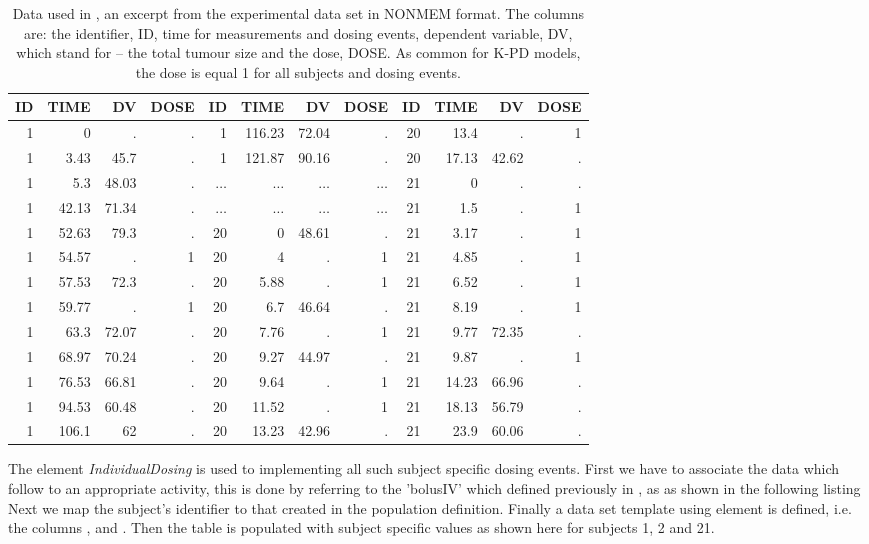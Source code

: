 \begin{table}[htdp]
\begin{center}
\begin{tabular}{rrrr | rrrr | rrrr}\toprule
ID&TIME&DV&DOSE & ID&TIME&DV&DOSE& 			ID&TIME&DV&DOSE \\\midrule
1&0&.&.& 		 	1&116.23&72.04&.& 				20&13.4&.&1\\
1&3.43&45.7&.& 	1&121.87&90.16&.& 				20&17.13&42.62&.\\
1&5.3&48.03&.& 	$\dots$ &$\dots$ &$\dots$ & $\dots$&	21&0&.&.\\
1&42.13&71.34&.& 	$\dots$ &$\dots$ &$\dots$ & $\dots$&	21&1.5&.&1\\
1&52.63&79.3&.& 	20&0&48.61&.&					21&3.17&.&1\\
1&54.57&.&1 & 	20&4&.&1&						21&4.85&.&1\\
1&57.53&72.3&.& 	20&5.88&.&1&						21&6.52&.&1\\
1&59.77&.&1 & 	20&6.7&46.64&.&					21&8.19&.&1\\
1&63.3&72.07&.& 	20&7.76&.&1&						21&9.77&72.35&.\\
1&68.97&70.24&.& 	20&9.27&44.97&.&					21&9.87&.&1\\
1&76.53&66.81&.& 	20&9.64&.&1&						21&14.23&66.96&.\\
1&94.53&60.48&.&	20&11.52&.&1&					21&18.13&56.79&.\\
1&106.1&62&.& 	20&13.23&42.96&.&					21&23.9&60.06&.\\\bottomrule
\end{tabular}
\end{center}
\caption{Data used in \cite{Ribba:2012uq}, an excerpt from the experimental data set in NONMEM format. 
The columns are: the identifier, ID, time for measurements and dosing events, 
dependent variable, DV, which stand for  -- the total tumour size and 
the dose, DOSE. As common for K-PD models, the dose is equal 1 for all subjects and 
dosing events.}
\label{tab:Ribba_dataSet}
\end{table}%

The element \textit{IndividualDosing} is used to implementing all such subject specific
dosing events. First we have to associate the data which follow to an appropriate activity,
this is done by referring to the 'bolusIV' which defined previously in , as 
as shown in the following listing 
Next we map the subject's identifier  to that created in the population definition. 
Finally a data set template using  element is defined, 
i.e. the columns ,  and .
Then the table is populated with subject specific values as shown here for subjects 1, 2 and 21.


